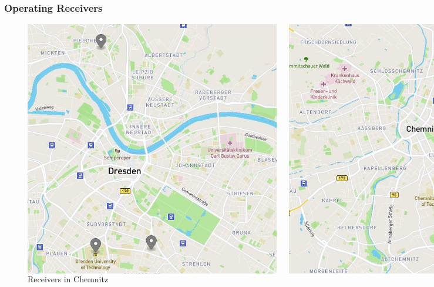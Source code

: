
\begin{frame}
  \frametitle{Operating Receivers}


\begin{figure}
\begin{columns}
\centering
  \includegraphics[height=0.65\textheight]{figs/map_dresden.jpg}
  \caption{Receivers in Dresden}
\centering
  \includegraphics[height=0.65\textheight]{figs/map_chemnitz.jpg}
  \caption{Receivers in Chemnitz}
\end{columns}
\end{figure}

\end{frame}

